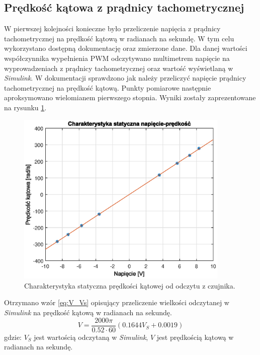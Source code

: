 \documentclass[11pt,a4paper]{article}
\begin{document}
\subsection{Prędkość kątowa z prądnicy tachometrycznej}
W pierwszej kolejności konieczne było przeliczenie napięcia z prądnicy tachometrycznej na prędkość kątową w radianach na sekundę. W tym celu wykorzystano dostępną dokumentację oraz zmierzone dane. Dla danej wartości współczynnika wypełnienia PWM odczytywano multimetrem napięcie na wyprowadzeniach z prądnicy tachometrycznej oraz wartość wyświetlaną w \textit{Simulink}. W dokumentacji sprawdzono jak należy przeliczyć napięcie prądnicy tachometrycznej na prędkość kątową. Punkty pomiarowe następnie aproksymowano wielomianem pierwszego stopnia. Wyniki zostały zaprezentowane na rysunku \ref{fig:char_V_U}.

\begin{figure}[H]
	\centering
	\includegraphics[width=4in]{Figures/char_V_U.eps}
	\caption{Charakterystyka statyczna prędkości kątowej od odczytu z czujnika.}
	\label{fig:char_V_U}
\end{figure}

Otrzymano wzór \eqref{eq:V_Vs} opisujący przeliczenie wielkości odczytanej w \textit{Simulink} na prędkość kątową w radianach na sekundę.
\begin{equation}
V = \frac{2000\pi}{0.52\cdot 60}(0.1644V_S+0.0019)
\label{eq:V_Vs}
\end{equation}
\noindent gdzie:\newline
\(V_S\) jest wartością odczytaną w \textit{Simulink},\newline
\(V\) jest prędkością kątową w radianach na sekundę.
\end{document}
